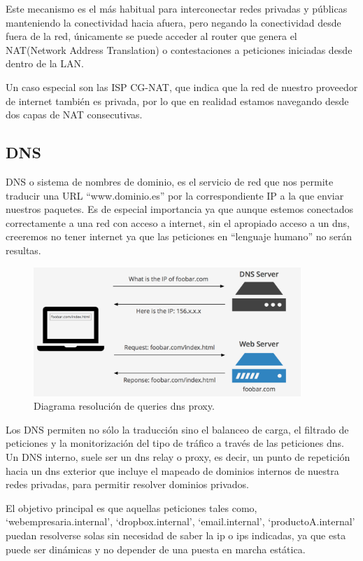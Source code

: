 Este mecanismo es el más habitual para interconectar redes privadas y públicas manteniendo la conectividad hacia afuera, pero negando la conectividad desde fuera de la red, únicamente se puede acceder al router que genera el NAT(Network Address Translation) o contestaciones a peticiones iniciadas desde dentro de la LAN.

Un caso especial son las ISP CG-NAT\cite{c_cg_nat}, que indica que la red de nuestro proveedor de internet también es privada, por lo que en realidad estamos navegando desde dos capas de NAT consecutivas.

\subsection{DNS}\label{S:dns}
DNS o sistema de nombres de dominio, es el servicio de red que nos permite traducir una URL “www.dominio.es” por la correspondiente IP a la que enviar nuestros paquetes. Es de especial importancia ya que aunque estemos conectados correctamente a una red con acceso a internet, sin el apropiado acceso a un dns, creeremos no tener internet ya que las peticiones en “lenguaje humano” no serán resultas.
\begin{figure}[!htb]
\begin{center}
\includegraphics[width=0.9\textwidth]{./figuras/dns_resolution}
\caption{Diagrama resolución de queries dns proxy\cite{i_dns}.}
\label{F:dns_resolution}
\end{center}
\end{figure}
Los DNS permiten no sólo la traducción sino el balanceo de carga, el filtrado de peticiones y la monitorización del tipo de tráfico a través de las peticiones dns. 
Un DNS interno, suele ser un dns relay o proxy, es decir, un punto de repetición hacia un dns exterior que incluye el mapeado de dominios internos de nuestra redes privadas, para permitir resolver dominios privados.

El objetivo principal es que aquellas peticiones tales como, ‘webempresaria.internal’, ‘dropbox.internal’, ‘email.internal’, ‘productoA.internal’ puedan resolverse solas sin necesidad de saber la ip o ips indicadas, ya que esta puede ser dinámicas  y no depender de una puesta en marcha estática.

